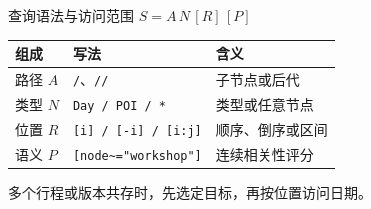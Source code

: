 \begin{frame}{查询语法与访问范围}
    \centering $S=A\,N\,[R]\,[P]$\par\vspace{3mm}
    \begin{tabularx}{\linewidth}{@{}p{22mm}p{45mm}Y@{}}
        \toprule 组成 & 写法 & 含义 \\
        \midrule
        路径 $A$ & \texttt{/}、\texttt{//} & 子节点或后代 \\
        类型 $N$ & \texttt{Day / POI / *} & 类型或任意节点 \\
        位置 $R$ & \texttt{[i] / [-i] / [i:j]} & 顺序、倒序或区间 \\
        语义 $P$ & \texttt{[node\textasciitilde="workshop"]} & 连续相关性评分 \\
        \bottomrule
    \end{tabularx}
    \par\vspace{4mm}{\small\ttfamily //Day[3]/POI[node\textasciitilde="workshop"]}
    \par\vspace{3mm}多个行程或版本共存时，先选定目标，再按位置访问日期。\par
\end{frame}


